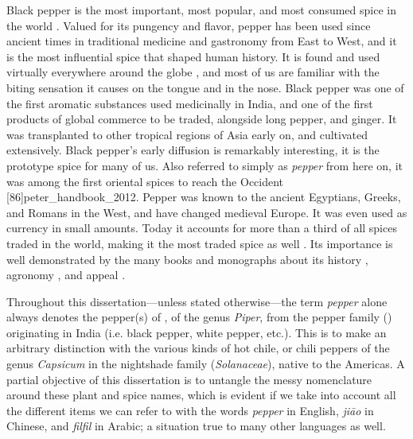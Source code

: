Black pepper is the most important, most popular, and most consumed spice in the world \autocite[721]{mabberley_mabberleys_2017}. Valued for its pungency and flavor, pepper has been used since ancient times in traditional medicine and gastronomy from East to West, and it is the most influential spice that shaped human history. It is found and used virtually everywhere around the globe \autocite[253]{hill_contemporary_2004}, and most of us are familiar with the biting sensation it causes on the tongue and in the nose. Black pepper was one of the first aromatic substances used medicinally in India, and one of the first products of global commerce to be traded, alongside long pepper, and ginger. It was transplanted to other tropical regions of Asia early on, and cultivated extensively. Black pepper's early diffusion is remarkably interesting, it is the prototype spice for many of us. Also referred to simply as \textit{pepper} from here on, it was among the first oriental spices to reach the Occident [86]{peter_handbook_2012}. Pepper was known to the ancient Egyptians, Greeks, and Romans in the West, and have changed medieval Europe. It was even used as currency in small amounts. Today it accounts for more than a third of all spices traded in the world, making it the most traded spice as well \autocite{ravindran_piper_2017}. Its importance is well demonstrated by the many books and monographs about its history \autocite[see][]{shaffer_pepper_2013,wernick_pepper_2014}, agronomy \autocite[see][]{ravindran_black_2000,nair_geography_2020}, and appeal \autocite[see][]{de_kerros_pepper_2016,barth_pepper_2019}.

\begin{note}
    Throughout this dissertation---unless stated otherwise---the term \textit{pepper} alone always denotes the pepper(s) of , of the genus \textit{Piper}, from the pepper family () originating in India (i.e. black pepper, white pepper, etc.). This is to make an arbitrary distinction with the various kinds of hot chile, or chili peppers of the genus \textit{Capsicum} in the nightshade family (\textit{Solanaceae}), native to the Americas. A partial objective of this dissertation is to untangle the messy nomenclature around these plant and spice names, which is evident if we take into account all the different items we can refer to with the words \textit{pepper} in English, \textit{jiāo} in Chinese, and \textit{filfil} in Arabic; a situation true to many other languages as well. 
    \end{note}

